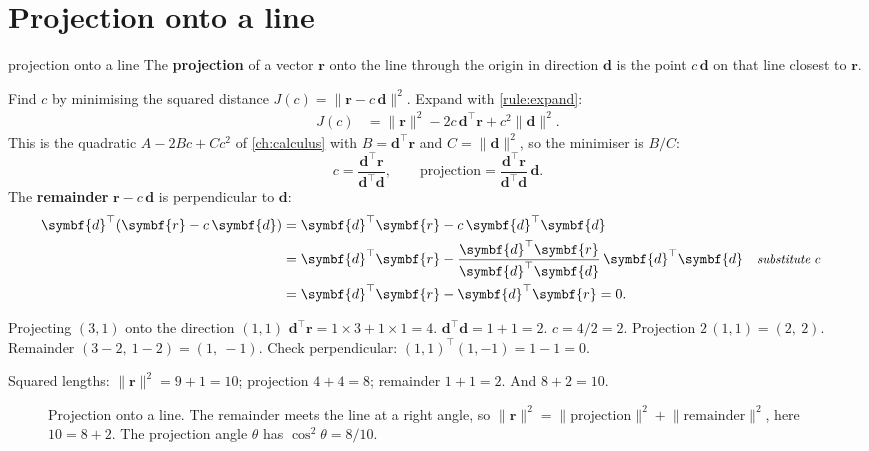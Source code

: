 \documentclass[11pt,a4paper,oneside,openany]{book}
\newcommand{\B}[1]{{\symbf{#1}}}
\newcommand{\B}[1]{{\bm{#1}}}
\newcommand{\T}{^{\top}}
\newcommand{\nrm}[1]{\lVert #1\rVert}
\newcommand{\vr}{\B{r}}
\newcommand{\vd}{\B{d}}
\newcommand{\why}[1]{&&\text{\small\itshape #1}}
\begin{document}
\section{Projection onto a line}

\begin{defn}{projection onto a line}
The \textbf{projection} of a vector $\vr$ onto the line through the origin in direction $\vd$ is the point $c\,\vd$ on that line
closest to $\vr$.
\end{defn}

Find $c$ by minimising the squared distance $J(c)=\nrm{\vr-c\,\vd}^2$. Expand with \cref{rule:expand}:
\begin{align*}
J(c) &= \nrm{\vr}^2-2c\,\vd\T\vr+c^2\nrm{\vd}^2 .
\end{align*}
This is the quadratic $A-2Bc+Cc^2$ of \cref{ch:calculus} with $B=\vd\T\vr$ and $C=\nrm{\vd}^2$, so the minimiser is $B/C$:
\[
  c=\frac{\vd\T\vr}{\vd\T\vd},\qquad \text{projection}=\frac{\vd\T\vr}{\vd\T\vd}\,\vd .
\]
The \textbf{remainder} $\vr-c\,\vd$ is perpendicular to $\vd$:
\begin{align*}
\vd\T(\vr-c\,\vd) &= \vd\T\vr-c\,\vd\T\vd\\
 &= \vd\T\vr-\frac{\vd\T\vr}{\vd\T\vd}\,\vd\T\vd \why{substitute $c$}\\
 &= \vd\T\vr-\vd\T\vr=0 .
\end{align*}

\begin{worked}[label=we:projline]{Projecting $(3,1)$ onto the direction $(1,1)$}
$\vd\T\vr=1\times3+1\times1=4$. $\vd\T\vd=1+1=2$. $c=4/2=2$. Projection $2\,(1,1)=(2,\ 2)$. Remainder
$(3-2,\ 1-2)=(1,\ -1)$. Check perpendicular: $(1,1)\T(1,-1)=1-1=0$.

Squared lengths: $\nrm{\vr}^2=9+1=10$; projection $4+4=8$; remainder $1+1=2$. And $8+2=10$.
\end{worked}

\begin{figure}[ht]
\centering
{}
\caption{Projection onto a line. The remainder meets the line at a right angle, so
$\nrm{\vr}^2=\nrm{\text{projection}}^2+\nrm{\text{remainder}}^2$, here $10=8+2$. The projection angle $\theta$ has
$\cos^2\theta=8/10$.}
\label{fig:proj}
\end{figure}
\end{document}
